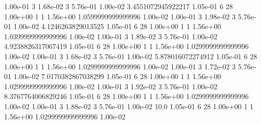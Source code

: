 {1.00e-01 3 1.68e-02 3 5.76e-01 1.00e-02 3.4551072945922217 1.05e-01 6 28 1.00e+00 1 1 1.56e+00 1.0599999999999996 1.00e-02
1.00e-01 3 1.98e-02 3 5.76e-01 1.00e-02 4.1246263829013525 1.05e-01 6 28 1.00e+00 1 1 1.56e+00 1.0399999999999996 1.00e-02
1.00e-01 3 1.89e-02 3 5.76e-01 1.00e-02 4.9238826317067419 1.05e-01 6 28 1.00e+00 1 1 1.56e+00 1.0299999999999996 1.00e-02
1.00e-01 3 1.68e-02 3 5.76e-01 1.00e-02 5.878016072274912 1.05e-01 6 28 1.00e+00 1 1 1.56e+00 1.0299999999999996 1.00e-02
1.00e-01 3 1.72e-02 3 5.76e-01 1.00e-02 7.0170382867038299 1.05e-01 6 28 1.00e+00 1 1 1.56e+00 1.0299999999999996 1.00e-02
1.00e-01 3 1.92e-02 3 5.76e-01 1.00e-02 8.3767764006829246 1.05e-01 6 28 1.00e+00 1 1 1.56e+00 1.0299999999999996 1.00e-02
1.00e-01 3 1.88e-02 3 5.76e-01 1.00e-02 10.0 1.05e-01 6 28 1.00e+00 1 1 1.56e+00 1.0299999999999996 1.00e-02
}\datadoublereduced

